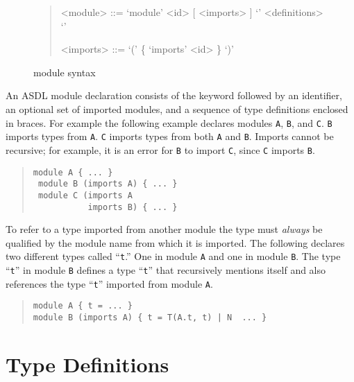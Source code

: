 \begin{figure}[t]
  \begin{quote}
    \begin{grammar}
      <module>  ::=  `module' <id> [ <imports> ] `{' <definitions> `}'

      <imports> ::=  `(' \{ `imports' <id> \} `)'
    \end{grammar}
  \end{quote}
  \caption{\asdl{} module syntax}
  \label{fig:module-syntax}
\end{figure}%

An ASDL module declaration consists of the keyword 
followed by an identifier, an optional set of imported modules, and a
sequence of type definitions enclosed in braces. For example the
following example declares modules \lstinline[language=ASDL]!A!,
\lstinline[language=ASDL]!B!, and \lstinline[language=ASDL]!C!.
\lstinline[language=ASDL]!B! imports types from \lstinline[language=ASDL]!A!.
\lstinline[language=ASDL]!C! imports types from both \lstinline[language=ASDL]!A! and
\lstinline[language=ASDL]!B!.
Imports cannot be recursive; for example, it is an error for \lstinline[language=ASDL]!B! to
import \lstinline[language=ASDL]!C!, since \lstinline[language=ASDL]!C!
imports \lstinline[language=ASDL]!B!.
\begin{quote}\begin{lstlisting}[language=ASDL]
 module A { ... } 
 module B (imports A) { ... }
 module C (imports A 
           imports B) { ... }
\end{lstlisting}\end{quote}%

To refer to a type imported from another module the type must
\emph{always} be qualified by the module name from which it is
imported.
The following declares two different types called ``\texttt{t}.''
One in module \texttt{A} and one in module \texttt{B}.
The type ``\texttt{t}'' in module \texttt{B} defines a type ``\texttt{t}'' that
recursively mentions itself and also references the type ``\texttt{t}'' imported
from module \texttt{A}.
\begin{quote}\begin{lstlisting}[language=ASDL]
module A { t = ... } 
module B (imports A) { t = T(A.t, t) | N  ... }
\end{lstlisting}\end{quote}%

\section{Type Definitions}

